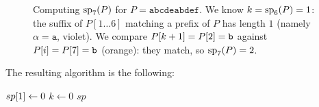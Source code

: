 \begin{figure}[H]
\caption{%
  Computing $\mathrm{sp}_{7}(P)$ for $P = \texttt{abcdeabdef}$.
  We know $k = \mathrm{sp}_{6}(P) = 1$: the suffix of $P[1\ldots6]$ matching a prefix of $P$
  has length $1$ (namely $\alpha = \texttt{a}$, \textcolor{violet!70!black}{violet}).
  We compare $P[k+1] = P\kern0pt[2] = \texttt{b}$ against $P\kern0pt[i] = P\kern0pt[7] = \texttt{b}$
  (\textcolor{orange!70!black}{orange}): they match, so $\mathrm{sp}_{7}(P) = 2$.
}
\label{fig:sp-computation}
\end{figure}

The resulting algorithm is the following:

\begin{algorithm}[H]
  \caption{Computing $sp$ values}
  $sp\kern0pt[1] \gets 0$ \;
  $k \gets 0$ 
  \Return $sp$
\end{algorithm}

